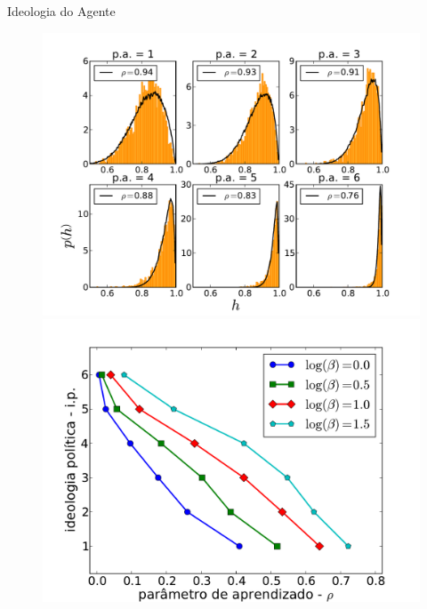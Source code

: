 \documentclass{beamer}
\begin{document}
   \begin{frame}{Ideologia do Agente}%

       \begin{figure}
           \centering
           \includegraphics[scale=0.25]{Figures/hists_b38}
           \quad
           \includegraphics[scale=0.25]{Figures/pa-rho.pdf}
        \end{figure}
   \end{frame}%
\end{document}
